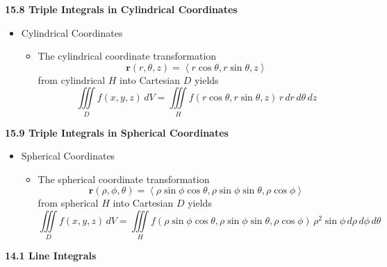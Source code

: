 \documentclass[12pt]{article}
\renewcommand{\vec}[1]{\mathbf{#1}}
\newcommand{\dvar}[1]{\,d{#1}}
\renewcommand{\d}[1]{\dvar{#1}}
\newcommand{\<}{\left<}
\renewcommand{\>}{\right>}
\begin{document}

\underline{\hspace*{6in}}

\centerline{\bf 15.8 Triple Integrals in Cylindrical Coordinates}
  
  \begin{itemize}
  
  \item Cylindrical Coordinates
    \begin{itemize}
    \item The cylindrical coordinate transformation \[\vec{r}(r,\theta,z) = \<r\cos\theta, r\sin\theta, z\>\] from cylindrical $H$ into Cartesian $D$ yields \[\iiint\limits_D f(x,y,z)\d{V} = \iiint\limits_H f(r\cos\theta,r\sin\theta,z)\,r\d{r}\d{\theta}\d{z}\]
    \end{itemize}
      
  
  
  \end{itemize}


\underline{\hspace*{6in}}

\centerline{\bf 15.9 Triple Integrals in Spherical Coordinates}

  \begin{itemize}
  
  \item Spherical Coordinates
    \begin{itemize}
    \item The spherical coordinate transformation \[\vec{r}(\rho,\phi,\theta)=\<\rho\sin\phi\cos\theta, \rho\sin\phi\sin\theta, \rho\cos\phi\>\] from spherical $H$ into Cartesian $D$ yields \[\iiint\limits_D f(x,y,z)\, dV = \iiint\limits_H f(\rho\sin\phi\cos\theta,\rho\sin\phi\sin\theta,\rho\cos\phi) \,\rho^2\sin\phi\dvar{\rho}\dvar{\phi}\dvar{\theta} \]
    \end{itemize}
  \end{itemize}
  
\newpage

\centerline{\bf 14.1 Line Integrals}
\end{document}
